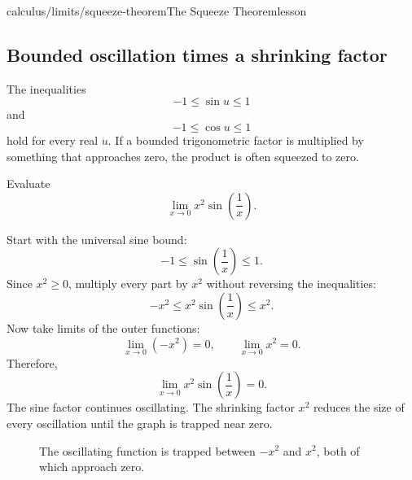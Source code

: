 \begin{webpage}{calculus/limits/squeeze-theorem}{The Squeeze Theorem}{lesson}
\subsection{Bounded oscillation times a shrinking factor}

The inequalities
\[
  -1\le\sin u\le1
\]
and
\[
  -1\le\cos u\le1
\]
hold for every real \(u\). If a bounded trigonometric factor is multiplied by something that approaches zero, the product is often squeezed to zero.

\begin{bgexample}[title={An oscillating function forced to zero}]
Evaluate
\[
  \lim_{x\to0}x^2\sin\left(\frac1x\right).
\]

\begin{bgsolution}
Start with the universal sine bound:
\[
  -1\le\sin\left(\frac1x\right)\le1.
\]
Since \(x^2\ge0\), multiply every part by \(x^2\) without reversing the inequalities:
\[
  -x^2\le x^2\sin\left(\frac1x\right)\le x^2.
\]
Now take limits of the outer functions:
\[
  \lim_{x\to0}(-x^2)=0,
  \qquad
  \lim_{x\to0}x^2=0.
\]
Therefore,
\[
  \boxed{\lim_{x\to0}x^2\sin\left(\frac1x\right)=0}.
\]
The sine factor continues oscillating. The shrinking factor \(x^2\) reduces the size of every oscillation until the graph is trapped near zero.
\end{bgsolution}
\end{bgexample}

\begin{figure}[htbp]
\centering
{}
\caption{The oscillating function is trapped between \(-x^2\) and \(x^2\), both of which approach zero.}
\label{fig:squeeze-oscillation}
\end{figure}


\end{webpage}
